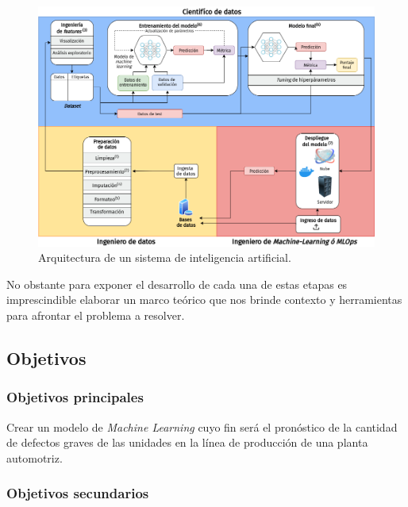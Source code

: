 \documentclass[a4paper,12pt]{article}
\begin{document}
\begin{figure}[]
	\begin{center}				
		\includegraphics[width=1\textwidth]{ml-cycle.png}
		\caption{Arquitectura de un sistema de inteligencia artificial.}
		\label{fig:flowchartml.}
	\end{center}
\end{figure}

No obstante para exponer el desarrollo de cada una de estas etapas es imprescindible elaborar un marco teórico que nos brinde contexto y herramientas para afrontar el problema a resolver.

\subsection{Objetivos}
\subsubsection{Objetivos principales}
Crear un modelo de \textit{Machine Learning} cuyo fin será el pronóstico de la cantidad de defectos graves de las unidades en la línea de producción de una planta automotriz.

\subsubsection{Objetivos secundarios}
\end{document}
